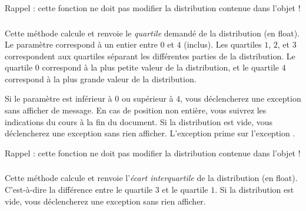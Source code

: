 \medskip

\noindent Rappel : cette fonction ne doit pas modifier la distribution contenue dans l'objet !


\subsubsection*{}

\noindent Cette méthode calcule et renvoie le \textit{quartile} demandé de la distribution (en float).
Le paramètre  correspond à un entier entre $ 0 $ et $ 4 $ (inclus).
Les quartiles $ 1 $, $ 2 $, et $ 3 $ correspondent aux quartiles séparant les différentes parties de la distribution.
Le quartile $ 0 $ correspond à la plus petite valeur de la distribution, et le quartile $ 4 $ correspond à la plus grande valeur de la distribution.

\noindent Si le paramètre  est inférieur à $ 0 $ ou supérieur à $ 4 $, vous déclencherez une exception  sans afficher de message.
En cas de position non entière, vous suivrez les indications du cours à la fin du document.
Si la distribution est vide, vous déclencherez une exception  sans rien afficher.
L'exception  prime sur l'exception .

\medskip

\noindent Rappel : cette fonction ne doit pas modifier la distribution contenue dans l'objet !



\subsubsection*{}

\noindent Cette méthode calcule et renvoie l'\textit{écart interquartile} de la distribution (en float).
C'est-à-dire la différence entre le quartile $ 3 $ et le quartile $ 1 $.
Si la distribution est vide, vous déclencherez une exception  sans rien afficher.


\subsubsection*{}

